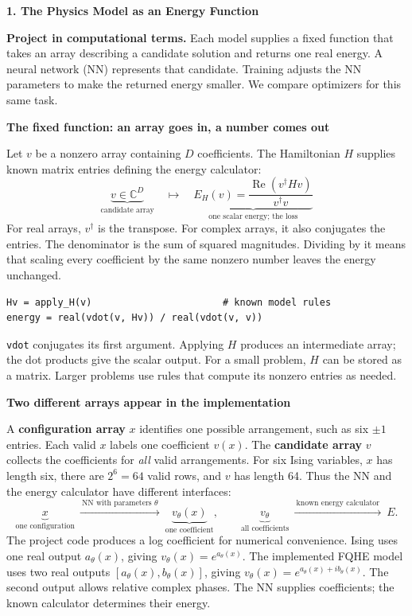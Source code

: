 \documentclass[11pt,letterpaper]{article}
\newcommand{\topic}[1]{\vspace{4pt}\textbf{\color{ink}#1}\par}
\newcommand{\pagetitle}[1]{\begin{center}{\Large\bfseries #1}\end{center}}
\newcommand{\Rea}{\operatorname{Re}}
\begin{document}
\pagetitle{1. The Physics Model as an Energy Function}

\textbf{Project in computational terms.} Each model supplies a fixed function that takes an array describing a candidate solution and returns one real energy. A neural network (NN) represents that candidate. Training adjusts the NN parameters to make the returned energy smaller. We compare optimizers for this same task.

\topic{The fixed function: an array goes in, a number comes out}
Let $v$ be a nonzero array containing $D$ coefficients. The Hamiltonian $H$ supplies known matrix entries defining the energy calculator:
\[
 \boxed{\quad \underbrace{v\in\mathbb C^D}_{\text{candidate array}}
 \quad\longmapsto\quad
 \underbrace{E_H(v)=\frac{\Rea(v^\dagger Hv)}{v^\dagger v}}_{\text{one scalar energy; the loss}}\quad}
\]
For real arrays, $v^\dagger$ is the transpose. For complex arrays, it also conjugates the entries. The denominator is the sum of squared magnitudes. Dividing by it means that scaling every coefficient by the same nonzero number leaves the energy unchanged.
\begin{verbatim}
Hv = apply_H(v)                       # known model rules
energy = real(vdot(v, Hv)) / real(vdot(v, v))
\end{verbatim}
\texttt{vdot} conjugates its first argument. Applying $H$ produces an intermediate array; the dot products give the scalar output. For a small problem, $H$ can be stored as a matrix. Larger problems use rules that compute its nonzero entries as needed.

\topic{Two different arrays appear in the implementation}
A \textbf{configuration array} $x$ identifies one possible arrangement, such as six $\pm1$ entries. Each valid $x$ labels one coefficient $v(x)$. The \textbf{candidate array} $v$ collects the coefficients for \emph{all} valid arrangements. For six Ising variables, $x$ has length six, there are $2^6=64$ valid rows, and $v$ has length 64. Thus the NN and the energy calculator have different interfaces:
\[
 \underbrace{x}_{\text{one configuration}}
 \ \xrightarrow{\ \text{NN with parameters }\theta\ }\
 \underbrace{v_\theta(x)}_{\text{one coefficient}},
 \qquad
 \underbrace{v_\theta}_{\text{all coefficients}}
 \ \xrightarrow{\ \text{known energy calculator}\ }\ E.
\]
The project code produces a log coefficient for numerical convenience. Ising uses one real output $a_\theta(x)$, giving $v_\theta(x)=e^{a_\theta(x)}$. The implemented FQHE model uses two real outputs $[a_\theta(x),b_\theta(x)]$, giving $v_\theta(x)=e^{a_\theta(x)+i b_\theta(x)}$. The second output allows relative complex phases. The NN supplies coefficients; the known calculator determines their energy.
\end{document}
